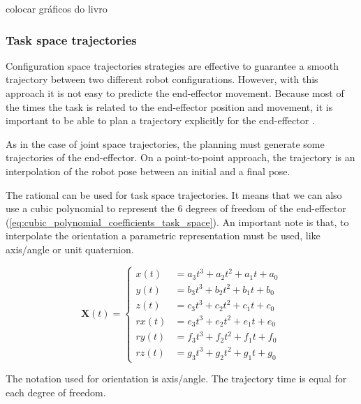 {\color{red} colocar gráficos do livro}


\subsubsection{Task space trajectories}
\label{subsubsec:task_space_trajectories}

Configuration space trajectories strategies are effective to guarantee a smooth trajectory between two different robot configurations. However, with this approach it is not easy to predicte the end-effector movement. Because most of the times the task is related to the end-effector position and movement, it is important to be able to plan a trajectory explicitly for the end-effector \cite{Siciliano2009_robotics_modelling_planning_control}.

As in the case of joint space trajectories, the planning must generate some trajectories of the end-effector. On a point-to-point approach, the trajectory is an interpolation of the robot pose between an initial and a final pose.

The rational can be used for task space trajectories. It means that we can also use a cubic polynomial to represent the 6 degrees of freedom of the end-effector (\ref{eq:cubic_polynomial_coefficients_task_space}). An important note is that, to interpolate the orientation a parametric representation must be used, like axis/angle or unit quaternion.

\begin{equation}
    \label{eq:cubic_polynomial_coefficients_task_space}
    \boldsymbol{X}(t) = \left\{
    \begin{aligned}
        x(t) &= a_3 t^3 + a_2 t^2 + a_1 t + a_0\\
        y(t) &= b_3 t^3 + b_2 t^2 + b_1 t + b_0\\
        z(t) &= c_3 t^3 + c_2 t^2 + c_1 t + c_0\\
        rx(t) &= e_3 t^3 + e_2 t^2 + e_1 t + e_0\\
        ry(t) &= f_3 t^3 + f_2 t^2 + f_1 t + f_0\\
        rz(t) &= g_3 t^3 + g_2 t^2 + g_1 t + g_0
    \end{aligned}
    \right.
\end{equation}

The notation used for orientation is axis/angle. The trajectory time is equal for each degree of freedom.

